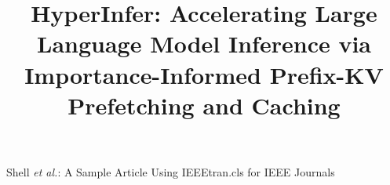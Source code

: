 \documentclass[lettersize,journal]{IEEEtran}
\newcommand{\pname}[1]{HyperInfer{#1}}
\begin{document}


%
{Shell \MakeLowercase{\textit{et al.}}: A Sample Article Using IEEEtran.cls for IEEE Journals}




\date{}

\title{\Large \bf \pname{}: Accelerating Large Language Model Inference via Importance-Informed Prefix-KV Prefetching and Caching}



\maketitle
\pagestyle{empty}









%




\end{document}
